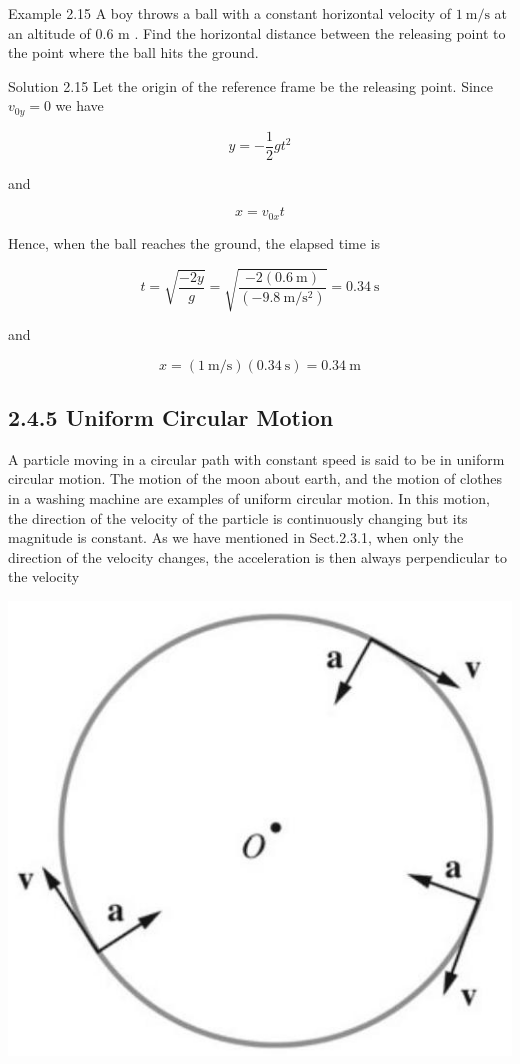 \documentclass[10pt]{article}
\begin{document}
Example 2.15 A boy throws a ball with a constant horizontal velocity of $1 \mathrm{~m} / \mathrm{s}$ at an altitude of 0.6 m . Find the horizontal distance between the releasing point to the point where the ball hits the ground.

Solution 2.15 Let the origin of the reference frame be the releasing point. Since $v_{0 y}=0$ we have

$$
y=-\frac{1}{2} g t^{2}
$$

and

$$
x=v_{0 x} t
$$

Hence, when the ball reaches the ground, the elapsed time is

$$
t=\sqrt{\frac{-2 y}{g}}=\sqrt{\frac{-2(0.6 \mathrm{~m})}{\left(-9.8 \mathrm{~m} / \mathrm{s}^{2}\right)}}=0.34 \mathrm{~s}
$$

and

$$
x=(1 \mathrm{~m} / \mathrm{s})(0.34 \mathrm{~s})=0.34 \mathrm{~m}
$$

\subsection*{2.4.5 Uniform Circular Motion}
A particle moving in a circular path with constant speed is said to be in uniform circular motion. The motion of the moon about earth, and the motion of clothes in a washing machine are examples of uniform circular motion. In this motion, the direction of the velocity of the particle is continuously changing but its magnitude is constant. As we have mentioned in Sect.2.3.1, when only the direction of the velocity changes, the acceleration is then always perpendicular to the velocity

\begin{center}
\includegraphics[max width=\textwidth]{2024_09_13_db1f357d2aad0a03eb2eg-040(1)}
\end{center}
\end{document}
